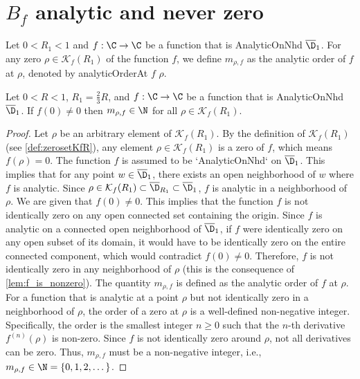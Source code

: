 \section{$B_f$ analytic and never zero}


\begin{definition} \label{def:m_rho_order} \leanok
Let $0<R_1<1$ and $f:\C\to\C$ be a function that is AnalyticOnNhd $\overline{\D}_1$. For any zero $\rho\in \mathcal K_f(R_1)$ of the function $f$, we define $m_{\rho,f}$ as the analytic order of $f$ at $\rho$, denoted by analyticOrderAt $f$ $\rho$.
\end{definition}

\begin{lemma} \label{lem:m_rho_is_nat}  \leanok
Let $0<R<1$, $R_1=\frac{2}{3}R$, and $f:\C\to\C$ be a function that is AnalyticOnNhd $\overline{\D}_1$. If $f(0)\neq0$ then $m_{\rho,f}\in\N$ for all $\rho\in \mathcal K_f(R_1)$.
\end{lemma}
\begin{proof} \leanok
{}
Let $\rho$ be an arbitrary element of $\mathcal{K}_f(R_1)$.
By the definition of $\mathcal{K}_f(R_1)$ (see \cref{def:zerosetKfR}), any element $\rho \in \mathcal{K}_f(R_1)$ is a zero of $f$, which means $f(\rho)=0$.
The function $f$ is assumed to be `AnalyticOnNhd` on $\overline{\D}_1$. This implies that for any point $w \in \overline{\D}_1$, there exists an open neighborhood of $w$ where $f$ is analytic. Since $\rho \in \mathcal{K}_f(R_1) \subset \overline{\D}_{R_1} \subset \overline{\D}_1$, $f$ is analytic in a neighborhood of $\rho$.
We are given that $f(0) \neq 0$. This implies that the function $f$ is not identically zero on any open connected set containing the origin. Since $f$ is analytic on a connected open neighborhood of $\overline{\D}_1$, if $f$ were identically zero on any open subset of its domain, it would have to be identically zero on the entire connected component, which would contradict $f(0) \neq 0$. Therefore, $f$ is not identically zero in any neighborhood of $\rho$ (this is the consequence of \cref{lem:f_is_nonzero}).
The quantity $m_{\rho,f}$ is defined as the analytic order of $f$ at $\rho$. For a function that is analytic at a point $\rho$ but not identically zero in a neighborhood of $\rho$, the order of a zero at $\rho$ is a well-defined non-negative integer.
Specifically, the order is the smallest integer $n \ge 0$ such that the $n$-th derivative $f^{(n)}(\rho)$ is non-zero. Since $f$ is not identically zero around $\rho$, not all derivatives can be zero.
Thus, $m_{\rho,f}$ must be a non-negative integer, i.e., $m_{\rho,f} \in \N = \{0, 1, 2, \dots\}$.
\end{proof}


